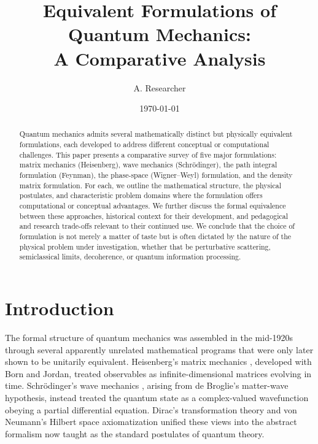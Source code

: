 \documentclass[11pt,a4paper]{article}
\title{\textbf{Equivalent Formulations of Quantum Mechanics: \\ A Comparative Analysis}}
\author[1]{A. Researcher}
\affil[1]{Department of Physics, Independent Study}
\date{\today}
\begin{document}
\maketitle

\begin{abstract}
\noindent
Quantum mechanics admits several mathematically distinct but physically equivalent formulations, each developed to address different conceptual or computational challenges. This paper presents a comparative survey of five major formulations: matrix mechanics (Heisenberg), wave mechanics (Schr\"odinger), the path integral formulation (Feynman), the phase-space (Wigner--Weyl) formulation, and the density matrix formulation. For each, we outline the mathematical structure, the physical postulates, and characteristic problem domains where the formulation offers computational or conceptual advantages. We further discuss the formal equivalence between these approaches, historical context for their development, and pedagogical and research trade-offs relevant to their continued use. We conclude that the choice of formulation is not merely a matter of taste but is often dictated by the nature of the physical problem under investigation, whether that be perturbative scattering, semiclassical limits, decoherence, or quantum information processing.
\end{abstract}

\tableofcontents

\section{Introduction}

The formal structure of quantum mechanics was assembled in the mid-1920s through several apparently unrelated mathematical programs that were only later shown to be unitarily equivalent. Heisenberg's matrix mechanics \citep{heisenberg1925}, developed with Born and Jordan, treated observables as infinite-dimensional matrices evolving in time. Schr\"odinger's wave mechanics \citep{schrodinger1926}, arising from de Broglie's matter-wave hypothesis, instead treated the quantum state as a complex-valued wavefunction obeying a partial differential equation. Dirac's transformation theory \citep{dirac1930} and von Neumann's Hilbert space axiomatization \citep{vonneumann1932} unified these views into the abstract formalism now taught as the standard postulates of quantum theory.
\end{document}
